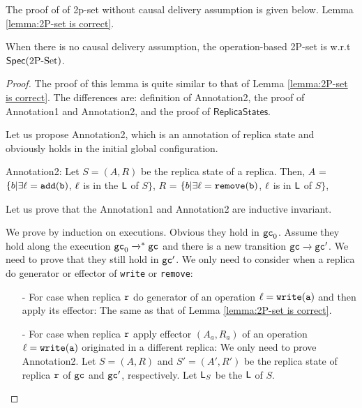 The proof of \crdtlin{} of 2p-set without causal delivery assumption is given below. Lemma \ref{lemma:2P-set is correct}.

\begin{lemma}
\label{lemma:when there is no causal delivery assumption, the operation-based 2p-set is still correct}
When there is no causal delivery assumption, the operation-based 2P-set is \crdtlinearizable{} w.r.t $\mathsf{Spec}(\text{2P\text{-}Set})$.
\end{lemma}

\begin {proof}

The proof of this lemma is quite similar to that of Lemma \ref{lemma:2P-set is correct}. The differences are: definition of Annotation2, the proof of Annotation1 and Annotation2, and the proof of $\mathsf{ReplicaStates}$.

Let us propose Annotation2, which is an annotation of replica state and obviously holds in the initial global configuration.

\noindent Annotation2: Let $S = (A,R)$ be the replica state of a replica. Then, $A$ =  $\{ b \vert \exists \alabel = \alabelshort[{\tt add}]{b}$, $\ell$ is in the $\mathsf{L}$ of $S\}$,
    $R$ =  $\{ b \vert \exists \alabel = \alabelshort[{\tt remove}]{b}$, $\ell$ is in $\mathsf{L}$ of $S\}$,

Let us prove that the Annotation1 and Annotation2 are inductive invariant.

We prove by induction on executions. Obvious they hold in $\mathtt{gc}_0$. Assume they hold along the execution $\mathtt{gc}_0 \xrightarrow{}^* \mathtt{gc}$ and there is a new transition $\mathtt{gc} \xrightarrow{} \mathtt{gc}'$. We need to prove that they still hold in $\mathtt{gc}'$. We only need to consider when a replica do generator or effector of {\tt write} or {\tt remove}:

\begin{itemize}
\setlength{\itemsep}{0.5pt}
\item[-] For case when replica $\mathtt{r}$ do generator of an operation $\alabel = \alabelshort[{\tt write}]{a}$ and then apply its effector: The same as that of Lemma \ref{lemma:2P-set is correct}.

\item[-] For case when replica $\mathtt{r}$ apply effector $(A_a,R_a)$ of an operation $\alabel = \alabelshort[{\tt write}]{a}$ originated in a different replica: We only need to prove Annotation2. Let $S=(A,R)$ and $S'=(A',R')$ be the replica state of replica $\mathtt{r}$ of $\mathtt{gc}$ and $\mathtt{gc}'$, respectively. Let $\mathsf{L}_S$ be the $\mathsf{L}$ of $S$.


\end{itemize}
\end{proof}
